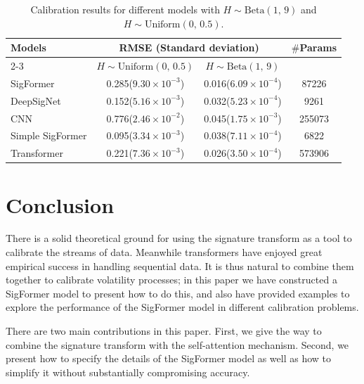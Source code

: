 \documentclass[]{article}
\renewcommand{\(}{\left(}
\renewcommand{\)}{\right)}
\begin{document}
		\begin{table}[H]
		\caption{Calibration results for different models with $H\sim\text{Beta}(1,\,9)$ and $H\sim\text{Uniform}(0,\,0.5)$.}
		\label{tab-empirical}
		\smallskip
		\centering
		\renewcommand\arraystretch{1.5}
		\begin{tabular}{l c c c}
			\toprule
			\multirow{2}{*}{Models}&\multicolumn{2}{c}{RMSE (Standard deviation)}&\multirow{2}{*}{$\#$Params}\\
			\cline{2-3}
			&$H\sim\text{Uniform}(0,\,0.5)$&$H\sim\text{Beta}(1,\,9)$&\\
			\hline
			SigFormer&0.285($9.30\times10^{-3}$)&0.016($6.09\times10^{-4}$)&87226\\
			\hline
			DeepSigNet&0.152($5.16\times10^{-3}$)&0.032($5.23\times10^{-4}$)&9261\\
			\hline
			CNN&0.776($2.46\times10^{-2}$)&0.045($1.75\times10^{-3}$)&255073\\
			\hline
			Simple SigFormer&0.095($3.34\times10^{-3}$)&0.038($7.11\times10^{-4}$)&6822\\
			\hline
			Transformer&0.221($7.36\times10^{-3}$)&0.026($3.50\times10^{-4}$)&573906\\
			\bottomrule
		\end{tabular}
	\end{table}
	
	\section{Conclusion}
	\label{sec-conclusion}
	There is a solid theoretical ground for using the signature transform as a tool to calibrate the streams of data. Meanwhile transformers have enjoyed great empirical success in handling sequential data. It is thus natural to combine them together to calibrate volatility processes; in this paper we have constructed a SigFormer model to present how to do this, and also have provided examples to explore the performance of the SigFormer model in different calibration problems.
	
	There are two main contributions in this paper. First, we give the way to combine the signature transform with the self-attention mechanism. Second, we present how to specify the details of the SigFormer model as well as how to simplify it without substantially compromising accuracy.
	
	\printbibliography
	
	
	
\end{document}
